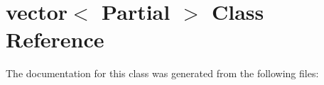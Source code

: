 \hypertarget{classvector_3_01Partial_01_4}{
\section{vector$<$ Partial $>$ Class Reference}
\label{classvector_3_01Partial_01_4}
}


The documentation for this class was generated from the following files: